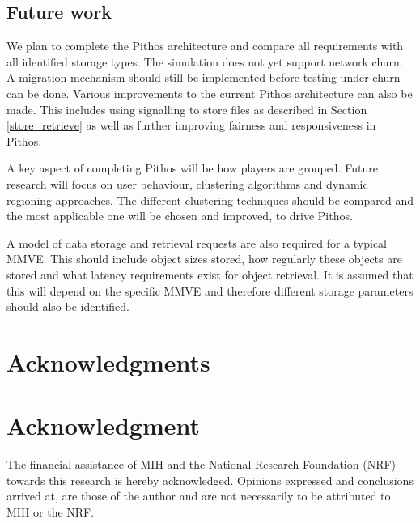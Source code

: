 \documentclass[10pt,a4paper,conference]{IEEEtran}
\begin{document}
\subsection{Future work}
\label{future_work}

We plan to complete the Pithos architecture and compare all requirements with all identified storage types. The simulation does not yet support
network churn. A migration mechanism should still be implemented before testing under churn can be done. Various improvements to the current Pithos
architecture can also be made. This includes using signalling to store files as described in Section \ref{store_retrieve} as well as further
improving fairness and responsiveness in Pithos.

A key aspect of completing Pithos will be how players are grouped. Future research will focus on user behaviour, clustering algorithms and dynamic
regioning approaches. The different clustering techniques should be compared and the most applicable one will be chosen and improved, to drive
Pithos.

A model of data storage and retrieval requests are also required for a typical MMVE. This should include object sizes stored, how regularly these
objects are stored and what latency requirements exist for object retrieval. It is assumed that this will depend on the specific MMVE and therefore
different storage parameters should also be identified.


\ifCLASSOPTIONcompsoc
  \section*{Acknowledgments}
\else
  \section*{Acknowledgment}
\fi

The financial assistance of MIH and the National Research Foundation (NRF) towards this research is hereby acknowledged. Opinions expressed and
conclusions arrived at, are those of the author and are not necessarily to be attributed to MIH or the NRF.




\end{document}
